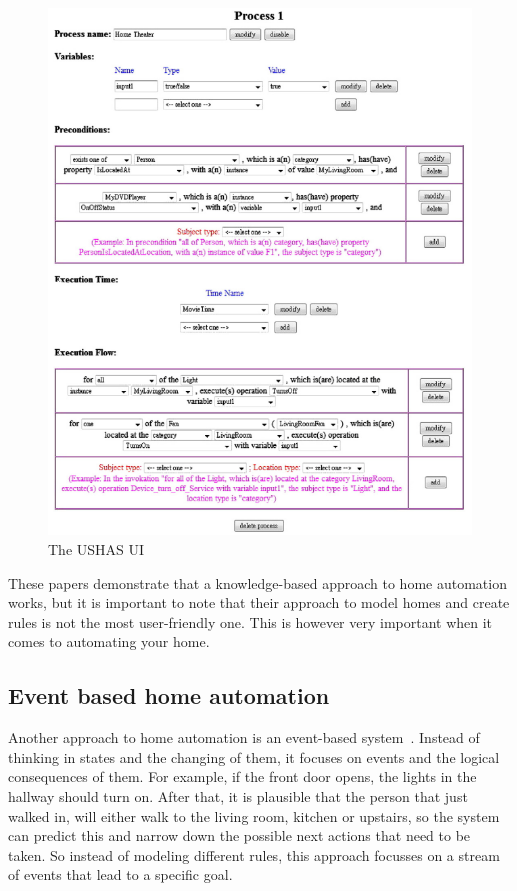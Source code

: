 \documentclass[11pt,a4paper]{report}
\begin{document}
\begin{figure}
    \centering
    \includegraphics[width=0.8\linewidth]{images/USHAS_UI.png}
    \caption{The USHAS UI~\cite{SOTA_AutomationConfigurationSmarthome}}
    \label{fig:USHAS_UI}
\end{figure}

These papers demonstrate that a knowledge-based approach to home automation works, but it is important to note that their approach to model homes and create rules is not the most user-friendly one. This is however very important when it comes to automating your home.

\subsection{Event based home automation}
Another approach to home automation is an event-based system~\cite{SOTA_EventCalculus}. Instead of thinking in states and the changing of them, it focuses on events and the logical consequences of them. For example, if the front door opens, the lights in the hallway should turn on. After that, it is plausible that the person that just walked in, will either walk to the living room, kitchen or upstairs, so the system can predict this and narrow down the possible next actions that need to be taken. So instead of modeling different rules, this approach focusses on a stream of events that lead to a specific goal.
\end{document}
